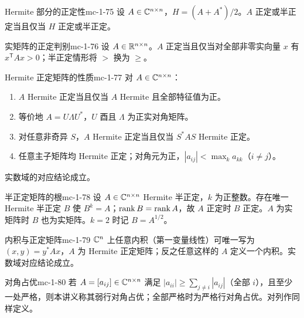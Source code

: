 \begin{theorem}{Hermite 部分的正定性}{mc-1-75}
设 $A\in\mathbb{C}^{n\times n}$，$H=(A+A^*)/2$。$A$ 正定或半正定当且仅当 $H$ 正定或半正定。
\end{theorem}

\begin{theorem}{实矩阵的正定判别}{mc-1-76}
设 $A\in\mathbb{R}^{n\times n}$。$A$ 正定当且仅当对全部非零实向量 $x$ 有 $x^{\mathsf T}Ax>0$；半正定情形将 $>$ 换为 $\geq$。
\end{theorem}

\begin{proposition}{Hermite 正定矩阵的性质}{mc-1-77}
对 $A\in\mathbb{C}^{n\times n}$：
\begin{enumerate}
\item $A$ Hermite 正定当且仅当 $A$ Hermite 且全部特征值为正。
\item 等价地 $A=U\Lambda U^*$，$U$ 酉且 $\Lambda$ 为正实对角矩阵。
\item 对任意非奇异 $S$，$A$ Hermite 正定当且仅当 $S^*AS$ Hermite 正定。
\item 任意主子矩阵均 Hermite 正定；对角元为正，$|a_{ij}|<\max_k a_{kk}$（$i\ne j$）。
\end{enumerate}
实数域的对应结论成立。
\end{proposition}

\begin{theorem}{半正定矩阵的根}{mc-1-78}
设 $A\in\mathbb{C}^{n\times n}$ Hermite 半正定，$k$ 为正整数。存在唯一 Hermite 半正定 $B$ 使 $B^k=A$；$\operatorname{rank} B=\operatorname{rank} A$，故 $A$ 正定时 $B$ 正定。$A$ 为实矩阵时 $B$ 也为实矩阵。$k=2$ 时记 $B=A^{1/2}$。
\end{theorem}

\begin{theorem}{内积与正定矩阵}{mc-1-79}
$\mathbb{C}^n$ 上任意内积（第一变量线性）可唯一写为 $(x,y)=y^*Ax$，$A$ 为 Hermite 正定矩阵；反之任意这样的 $A$ 定义一个内积。实数域对应结论成立。
\end{theorem}

\begin{definition}{对角占优}{mc-1-80}
若 $A=[a_{ij}]\in\mathbb{C}^{n\times n}$ 满足 $|a_{ii}|\geq\sum_{j\ne i}|a_{ij}|$（全部 $i$），且至少一处严格，则本讲义称其弱行对角占优；全部严格时为严格行对角占优。对列作同样定义。
\end{definition}

